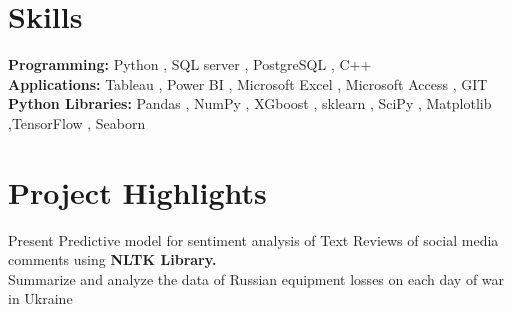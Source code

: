 \documentclass[]{Keval-resume}
\begin{document}
\begin{flushleft}
\sectionsep





\section{Skills} 
\hrulefill
\postsectionsep

\textbullet{} \textbf{Programming:} Python , SQL server , PostgreSQL , C++ \\
\textbullet{} \textbf{Applications:} Tableau , Power BI , Microsoft Excel , Microsoft Access ,  GIT  \\
\textbullet{} \textbf{Python Libraries:} Pandas , NumPy , XGboost , sklearn , SciPy , Matplotlib ,TensorFlow , Seaborn

\sectionsep
\section{Project Highlights}
\hrulefill




  {Present}
\textbullet{}  Predictive model for sentiment analysis of Text Reviews of social media comments using \textbf{ NLTK Library.} \\
\textbullet{}  Summarize and analyze the data of Russian equipment losses on each day of war in Ukraine \\



\end{flushleft}
\end{document}
